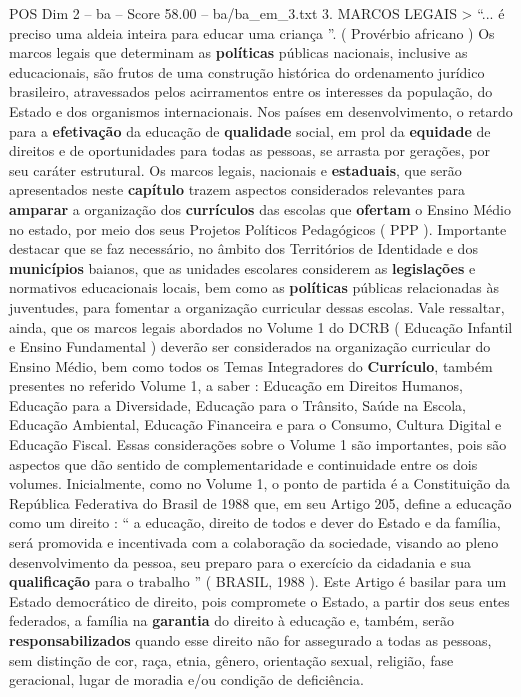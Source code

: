 \begin{textsample}{POS Dim 2 – ba – Score 58.00 – ba/ba\_em\_3.txt}  \label{ex:f2_pos_031}
3.
MARCOS LEGAIS > “... é preciso uma aldeia inteira para educar uma criança ”. ( Provérbio africano ) Os marcos legais que determinam as \textbf{políticas} públicas nacionais, inclusive as educacionais, são frutos de uma construção histórica do ordenamento jurídico brasileiro, atravessados pelos acirramentos entre os interesses da população, do Estado e dos organismos internacionais.
Nos países em desenvolvimento, o retardo para a \textbf{efetivação} da educação de \textbf{qualidade} social, em prol da \textbf{equidade} de direitos e de oportunidades para todas as pessoas, se arrasta por gerações, por seu caráter estrutural.
Os marcos legais, nacionais e \textbf{estaduais}, que serão apresentados neste \textbf{capítulo} trazem aspectos considerados relevantes para \textbf{amparar} a organização dos \textbf{currículos} das escolas que \textbf{ofertam} o Ensino Médio no estado, por meio dos seus Projetos Políticos Pedagógicos ( PPP ).
Importante destacar que se faz necessário, no âmbito dos Territórios de Identidade e dos \textbf{municípios} baianos, que as unidades escolares considerem as \textbf{legislações} e normativos educacionais locais, bem como as \textbf{políticas} públicas relacionadas às juventudes, para fomentar a organização curricular dessas escolas.
Vale ressaltar, ainda, que os marcos legais abordados no Volume 1 do DCRB ( Educação Infantil e Ensino Fundamental ) deverão ser considerados na organização curricular do Ensino Médio, bem como todos os Temas Integradores do \textbf{Currículo}, também presentes no referido Volume 1, a saber : Educação em Direitos Humanos, Educação para a Diversidade, Educação para o Trânsito, Saúde na Escola, Educação Ambiental, Educação Financeira e para o Consumo, Cultura Digital e Educação Fiscal.
Essas considerações sobre o Volume 1 são importantes, pois são aspectos que dão sentido de complementaridade e continuidade entre os dois volumes.
Inicialmente, como no Volume 1, o ponto de partida é a Constituição da República Federativa do Brasil de 1988 que, em seu Artigo 205, define a educação como um direito : “ a educação, direito de todos e dever do Estado e da família, será promovida e incentivada com a colaboração da sociedade, visando ao pleno desenvolvimento da pessoa, seu preparo para o exercício da cidadania e sua \textbf{qualificação} para o trabalho ” ( BRASIL, 1988 ).
Este Artigo é basilar para um Estado democrático de direito, pois compromete o Estado, a partir dos seus entes federados, a família na \textbf{garantia} do direito à educação e, também, serão \textbf{responsabilizados} quando esse direito não for assegurado a todas as pessoas, sem distinção de cor, raça, etnia, gênero, orientação sexual, religião, fase geracional, lugar de moradia e/ou condição de deficiência.

\end{textsample}
